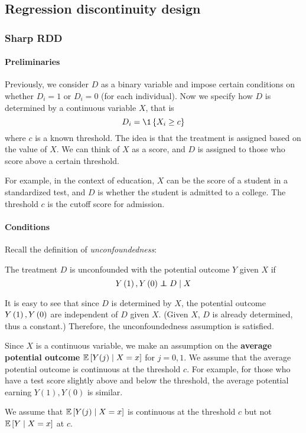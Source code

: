 \subsection{Regression discontinuity design}
\subsubsection{Sharp RDD}
\paragraph{Preliminaries}
Previously, we consider $D$ as a binary variable and impose certain conditions on whether $D_i=1$ or $D_i=0$ (for each individual). Now we specify how $D$ is determined by a continuous variable $X$, that is  $$D_i=\1\set{X_i\ge c}$$
where $c$ is a known threshold. The idea is that the treatment is assigned based on the value of $X$. We can think of $X$ as a score, and $D$ is assigned to those who score above a certain threshold.

For example, in the context of education, $X$ can be the score of a student in a standardized test, and $D$ is whether the student is admitted to a college. The threshold $c$ is the cutoff score for admission.

\paragraph{Conditions}
Recall the definition of \emph{unconfoundedness}:
\begin{definition}[unconfoundedness]
    The treatment $D$ is unconfounded with the potential outcome $Y$ given $X$ if 
    \begin{equation*}
        Y\left(1\right),Y\left(0\right)\perp\!\!\!\!\perp D\mid X
    \end{equation*}
\end{definition}

It is easy to see that since $D$ is determined by $X$, the potential outcome $Y\left(1\right),Y\left(0\right)$ are independent of $D$ given $X$. (Given $X$, $D$ is already determined, thus a constant.) Therefore, the unconfoundedness assumption is satisfied.


Since $X$ is a continuous variable, we make an assumption on the \textbf{average potential outcome} $\mathbb{E}\left[Y(j)\mid X=x\right]$ for $j=0,1$. We assume that the average potential outcome is continuous at the threshold $c$. For example, for those who have a test score slightly above and below the threshold, the average potential earning $Y(1),Y(0)$ is similar.
\begin{remark}
    We assume that $\mathbb{E}\left[Y(j)\mid X=x\right]$ is continuous at the threshold $c$ but not $\mathbb{E}\left[Y\mid X=x\right]$ at $c$.
\end{remark}

